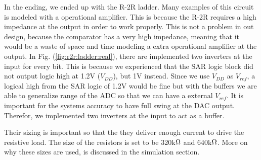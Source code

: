 \documentclass[english, 12pt, a4paper]{ifimaster}
\begin{document}
\newline
In the ending, we ended up with the R-2R ladder. Many examples of this circuit is modeled with a operational amplifier. This is because the R-2R requires a high impedance at the output in order to
work properly. This is not a problem in out design, because the comparator has a very high impedance, meaning that it would be a waste of space and time modeling a extra operational amplifier at
the output. In Fig. (\ref{fig:r2r:ladder:real}), there are implemented two inverters at the input for every bit. This is because we experienced that the SAR logic block did not output logic high at
1.2V (\(V_{DD}\)), but 1V instead. Since we use \(V_{DD}\) as \(V_{ref}\), a logical high from the SAR logic of 1.2V would be fine but with the buffers we are able to generalize range of the ADC so that we can have a external \(V_{ref}\).
It is important for the systems accuracy to have full swing at the DAC output. Therefor, we implemented two inverters at the input to act as a buffer. 

Their sizing is important so that the they deliver enough current to drive the resistive load.
The size of the resistors is set to be 320k\(\ohm\) and 640k\(\ohm\). More on why these sizes are used, is discussed in the simulation section. 
\end{document}
